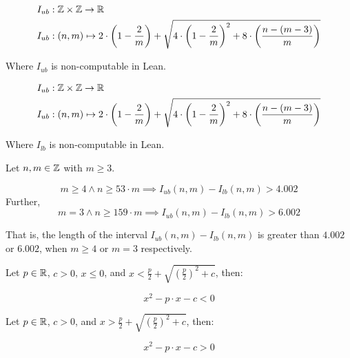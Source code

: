 \begin{definition}[I ub]
    \label{def:I_ub}
    \leanok
    
    \begin{align*}
        I_{ub} &: \mathbb{Z}\times \mathbb{Z} \to \mathbb{R} \\
        I_{ub} &: (n,m) \mapsto 2 \cdot \left(1 - \frac{2}{m}\right) + \sqrt{4\cdot \left(1 - \frac{2}{m}\right)^2 + 8\cdot \left(\frac{n - (m - 3)}{m}\right)}
    \end{align*}

    Where $I_{ub}$ is non-computable in Lean.
\end{definition}

\begin{definition}[I lb]
    \label{def:I_lb}
    \leanok
    
    \begin{align*}
        I_{ub} &: \mathbb{Z}\times \mathbb{Z} \to \mathbb{R} \\
        I_{ub} &: (n,m) \mapsto 2 \cdot \left(1 - \frac{2}{m}\right) + \sqrt{4\cdot \left(1 - \frac{2}{m}\right)^2 + 8\cdot \left(\frac{n - (m - 3)}{m}\right)}
    \end{align*}

    Where $I_{lb}$ is non-computable in Lean.
\end{definition}

\begin{lemma}[lemma4]
    \label{lem:lemma4}
    \leanok
    Let $n,m\in\mathbb{Z}$ with $m\geq 3$.

    \[
        m \geq 4 \land n \geq 53\cdot m \implies I_{ub}(n,m) - I_{lb}(n,m) > 4.002
    \]
    Further,
    \[
        m = 3\land n \geq 159\cdot m \implies I_{ub}(n,m) - I_{lb}(n,m) > 6.002
    \]

    That is, the length of the interval $I_{ub}(n,m) - I_{lb}(n,m)$ is greater than $4.002$ or $6.002$, when $m\geq 4$ or $m = 3$ respectively.
\end{lemma}

\begin{lemma}[qub]
    \label{lem:qub}
    \leanok
    Let $p\in \mathbb{R}$, $c > 0$, $x\leq 0$, and $x< \frac{p}{2} + \sqrt{\left(\frac{p}{2}\right)^2 + c}$, then:

    \[
        x^2 - p \cdot x- c < 0
    \]
\end{lemma}

\begin{lemma}[qlb]
    \label{lem:qlb}
    \leanok
    Let $p\in \mathbb{R}$, $c > 0$, and $x > \frac{p}{2} + \sqrt{\left(\frac{p}{2}\right)^2 + c}$, then:

    \[
        x^2 - p \cdot x- c > 0
    \]
\end{lemma}

